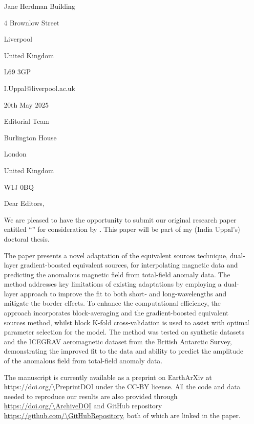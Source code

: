 \documentclass[a4paper,onecolumn,10pt]{article}
\begin{document}
\begin{flushright}
    Jane Herdman Building
    
    4 Brownlow Street
    
    Liverpool
    
    United Kingdom
    
    L69 3GP
    
    I.Uppal@liverpool.ac.uk
    
    20th May 2025

\end{flushright}

\begin{flushleft}
    \Journal
    
    Editorial Team
    
    Burlington House
    
    London
    
    United Kingdom
    
    W1J 0BQ
\end{flushleft}

\noindent
Dear Editors,

We are pleased to have the opportunity to submit our original research paper entitled ``\Title{}'' for
consideration by \Journal{}. This paper will be part of my (India Uppal’s) doctoral thesis.

The paper presents a novel adaptation of the equivalent sources technique, dual-layer gradient-boosted equivalent sources, for interpolating magnetic data and predicting the anomalous magnetic field from total-field anomaly data. The method addresses key limitations of existing adaptations by employing a dual-layer approach to improve the fit to both short- and long-wavelengths and mitigate the border effects. To enhance the computational efficiency, the approach incorporates block-averaging and the gradient-boosted equivalent sources method, whilst block K-fold cross-validation is used to assist with optimal parameter selection for the model. The method was tested on synthetic datasets and the ICEGRAV aeromagnetic dataset from the British Antarctic Survey, demonstrating the improved fit to the data and ability to predict the amplitude of the anomalous field from total-field anomaly data.

The manuscript is currently available as a preprint on EarthArXiv at \url{https://doi.org/\PreprintDOI} under the CC-BY license. All the code and data needed to reproduce our results are also provided through \url{https://doi.org/\ArchiveDOI} and GitHub repository \url{https://github.com/\GitHubRepository}, both of which are linked in the paper.
\end{document}
